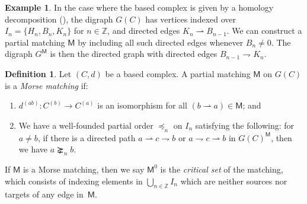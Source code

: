 \documentclass[11pt, table, nothms]{amsart}
\theoremstyle{definition}
\newtheorem{example}[theorem]{Example}
\newtheorem{definition}[theorem]{Definition}
\newcommand{\Z}{\mathbb{Z}}
\newcommand{\sM}{\mathsf{M}}
\begin{document}
{\begin{example}\label{ex:homology_decomposition_based_2} 
    In the case where the based complex is given by a homology decomposition (), the digraph $G(C)$ has vertices indexed over $I_n = \{H_n, B_n, K_n\}$ for $n \in \Z$, and directed edges $K_n \rightharpoonup B_{n-1}$. We can construct a partial matching $\sM$ by including all such directed edges whenever $B_n \neq 0$. The digraph $G^\sM$ is then the directed graph with directed edges $B_{n-1} \rightharpoondown K_n$.
\end{example}
\begin{definition}\label{def:Morse-matching}
    Let $(C, d)$ be a based complex.
    A partial matching $\sM$ on $G(C)$ is a \emph{Morse matching} if:
    \begin{enumerate}
        \item $d^{(ab)}: C^{(b)} \to C^{(a)}$
        is an isomorphism for all 
        $(b \rightharpoonup a)
        \in \sM$; and
        \item We have a well-founded partial order $\preceq_n$ on $I_n$ satisfying the following: for $a \neq b$, if there is a directed path $a\rightharpoonup c \rightharpoondown b$ or $a\rightharpoondown  c  \rightharpoonup b$ in $G(C)^\sM$, then we have $a \succneq_n b$.
    \end{enumerate}
\end{definition}
If $\sM$ is a Morse matching, then we say $\sM^0$ is the \emph{critical set} of the matching, which consists of indexing elements in $\bigcup_{n \in \Z} I_n$ which are neither sources nor targets of any edge in~$\sM$.


}
\end{document}
